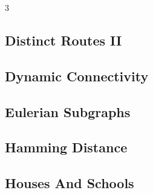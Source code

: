\documentclass[8pt]{extarticle}
\begin{document}
\begin{multicols*}{3}
\subsection{Distinct Routes II}
\begin{caixaenunciado}

\end{caixaenunciado}
\vspace{0.3cm}


\subsection{Dynamic Connectivity}
\begin{caixaenunciado}

\end{caixaenunciado}
\vspace{0.3cm}


\subsection{Eulerian Subgraphs}
\begin{caixaenunciado}

\end{caixaenunciado}
\vspace{0.3cm}


\subsection{Hamming Distance}
\begin{caixaenunciado}

\end{caixaenunciado}
\vspace{0.3cm}


\subsection{Houses And Schools}
\begin{caixaenunciado}

\end{caixaenunciado}
\vspace{0.3cm}



\end{multicols*}
\end{document}
